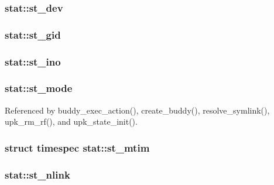 \subsubsection[{st\_\-dev}]{ {\bf stat::st\_\-dev}}\label{structstat_afb143a1534bf763afd6b353ea3cad102}
\subsubsection[{st\_\-gid}]{ {\bf stat::st\_\-gid}}\label{structstat_aa01a5406f3f4752281673e505aeea93f}
\subsubsection[{st\_\-ino}]{ {\bf stat::st\_\-ino}}\label{structstat_a1d7b4c479cacf6557db745dcc18ec603}
\subsubsection[{st\_\-mode}]{ {\bf stat::st\_\-mode}}\label{structstat_ad0ca66d10647cc5f8aaf1d06ab34ed54}


Referenced by buddy\_\-exec\_\-action(), create\_\-buddy(), resolve\_\-symlink(), upk\_\-rm\_\-rf(), and upk\_\-state\_\-init().

\subsubsection[{st\_\-mtim}]{\setlength{\rightskip}{0pt plus 5cm}struct {\bf timespec} {\bf stat::st\_\-mtim}}\label{structstat_a78eca07da5a8a88b1c3dd8be5a32821e}
\subsubsection[{st\_\-nlink}]{ {\bf stat::st\_\-nlink}}\label{structstat_a1d8d4cf9b348a7f706fef29aabd9bd13}
